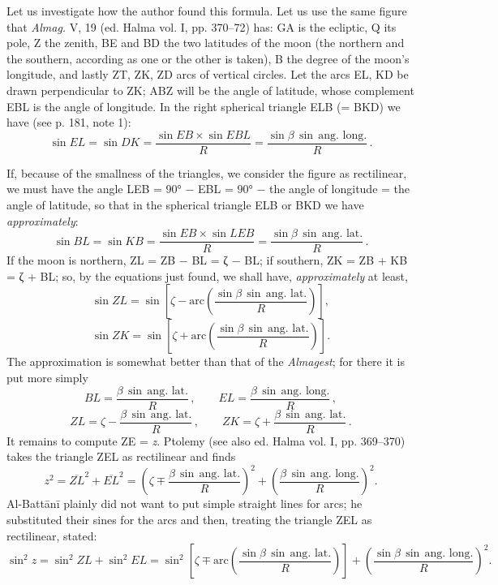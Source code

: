 \documentclass[11pt]{article}
\newcommand{\Pg}[1]{\marginpar{\footnotesize\color{gray}#1}}
\begin{document}
\par Let us investigate how the author found this formula. Let us use the same figure that \emph{Almag.} V, 19 (ed. Halma vol. I, pp. 370–72) has: GA is the ecliptic, Q its pole, Z the zenith, BE and BD the two latitudes of the moon (the northern and the southern, according as one or the other is taken), B the degree of the moon's longitude, and lastly ZT, ZK, ZD arcs of vertical circles. Let the arcs EL, KD be drawn perpendicular to ZK; ABZ will be the angle of latitude, whose complement EBL is the angle of longitude. In the right spherical triangle ELB (= BKD) we have (see p. 181, note 1): \[ \sin EL = \sin DK = \frac{\sin EB \times \sin EBL}{R} = \frac{\sin\beta\,\sin\,\text{ang. long.}}{R}\,. \]\par
\par \Pg{I 260}If, because of the smallness of the triangles, we consider the figure as rectilinear, we must have the angle LEB = 90° − EBL = 90° − the angle of longitude = the angle of latitude, so that in the spherical triangle ELB or BKD we have \emph{approximately}: \[ \sin BL = \sin KB = \frac{\sin EB \times \sin LEB}{R} = \frac{\sin\beta\,\sin\,\text{ang. lat.}}{R}\,. \] If the moon is northern, ZL = ZB − BL = {\greekfont ζ} − BL; if southern, ZK = ZB + KB = {\greekfont ζ} + BL; so, by the equations just found, we shall have, \emph{approximately} at least, \[ \sin ZL = \sin\left[\zeta - \text{arc}\left(\frac{\sin\beta\,\sin\,\text{ang. lat.}}{R}\right)\right], \] \[ \sin ZK = \sin\left[\zeta + \text{arc}\left(\frac{\sin\beta\,\sin\,\text{ang. lat.}}{R}\right)\right]. \] The approximation is somewhat better than that of the \emph{Almagest}; for there it is put more simply \[ BL = \frac{\beta\,\sin\,\text{ang. lat.}}{R}\,, \qquad EL = \frac{\beta\,\sin\,\text{ang. long.}}{R}\,, \] \[ ZL = \zeta - \frac{\beta\,\sin\,\text{ang. lat.}}{R}\,, \qquad ZK = \zeta + \frac{\beta\,\sin\,\text{ang. lat.}}{R}\,. \] It remains to compute ZE = \emph{z}. Ptolemy (see also ed. Halma vol. I, pp. 369–370) takes the triangle ZEL as rectilinear and finds \[ z^{2} = \overline{ZL}^{2} + \overline{EL}^{2} = \left(\zeta \mp \frac{\beta\,\sin\,\text{ang. lat.}}{R}\right)^{2} + \left(\frac{\beta\,\sin\,\text{ang. long.}}{R}\right)^{2}. \] Al-Battānī plainly did not want to put simple straight lines for arcs; he substituted their sines for the arcs and then, treating the triangle ZEL as rectilinear, stated: \[ \sin^{2} z = \sin^{2} ZL + \sin^{2} EL = \sin^{2}\left[\zeta \mp \text{arc}\left(\frac{\sin\beta\,\sin\,\text{ang. lat.}}{R}\right)\right] + \left(\frac{\sin\beta\,\sin\,\text{ang. long.}}{R}\right)^{2}. \]\par
\end{document}

